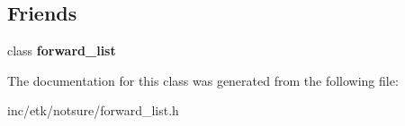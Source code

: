 \subsection*{Friends}
\begin{DoxyCompactItemize}
\item 
\hypertarget{classetk_1_1forward__list_1_1_iterator_a619e298e3f7eba65384a2e4e3e3d485d}{class {\bfseries forward\-\_\-list}}\label{classetk_1_1forward__list_1_1_iterator_a619e298e3f7eba65384a2e4e3e3d485d}

\end{DoxyCompactItemize}


The documentation for this class was generated from the following file\-:\begin{DoxyCompactItemize}
\item 
inc/etk/notsure/forward\-\_\-list.\-h\end{DoxyCompactItemize}
